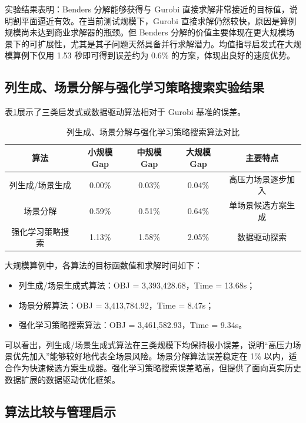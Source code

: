 \documentclass[12pt,a4paper]{article}
\newcommand{\手批注}[2]{\textcolor{#1}{\text{\kaishu #2}}}
\newcommand{\一阶段}{\textcolor{firststage}{\text{\kaishu （一阶段）}}}
\newcommand{\二阶段}{\textcolor{secondstage}{\text{\kaishu （二阶段）}}}
\begin{document}
实验结果表明：Benders 分解能够获得与 Gurobi 直接求解非常接近的目标值，说明割平面逼近有效。在当前测试规模下，Gurobi 直接求解仍然较快，原因是算例规模尚未达到商业求解器的瓶颈。但 Benders 分解的价值主要体现在更大规模场景下的可扩展性，尤其是其子问题天然具备并行求解潜力。均值指导启发式在大规模算例下仅用 1.53 秒即可得到误差约为 0.6\% 的方案，体现出良好的速度优势。

\subsection{列生成、场景分解与强化学习策略搜索实验结果}

表\ref{tab:other-algos}展示了三类启发式或数据驱动算法相对于 Gurobi 基准的误差。

\begin{table}[htbp]
\centering
\caption{列生成、场景分解与强化学习策略搜索算法对比}
\label{tab:other-algos}
\begin{tabular}{ccccc}
\toprule
算法 & 小规模Gap & 中规模Gap & 大规模Gap & 主要特点 \\
\midrule
列生成/场景生成 & 0.00\% & 0.03\% & 0.04\% & 高压力场景逐步加入 \\
场景分解 & 0.59\% & 0.51\% & 0.64\% & 单场景候选方案生成 \\
强化学习策略搜索 & 1.13\% & 1.58\% & 2.05\% & 数据驱动探索 \\
\bottomrule
\end{tabular}
\end{table}

大规模算例中，各算法的目标函数值和求解时间如下：
\begin{itemize}[itemsep=0.2em,leftmargin=2em]
    \item 列生成/场景生成式算法：OBJ = 3,393,428.68，Time = 13.68s；
    \item 场景分解算法：OBJ = 3,413,784.92，Time = 8.47s；
    \item 强化学习策略搜索算法：OBJ = 3,461,582.93，Time = 9.34s。
\end{itemize}

可以看出，列生成/场景生成式算法在三类规模下均保持极小误差，说明“高压力场景优先加入”能够较好地代表全场景风险。场景分解算法误差稳定在 1\% 以内，适合作为快速候选方案生成器。强化学习策略搜索误差略高，但提供了面向真实历史数据扩展的数据驱动优化框架。

\subsection{算法比较与管理启示}
\end{document}
